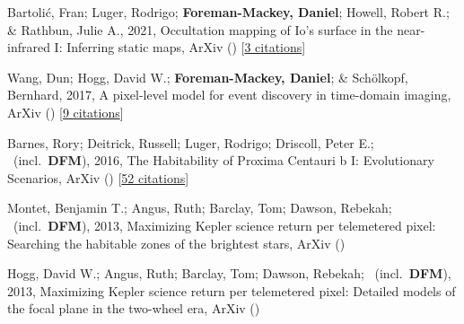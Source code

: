 \item[{\color{numcolor}\scriptsize5}] Bartoli{\'c}, Fran; Luger, Rodrigo; \textbf{Foreman-Mackey, Daniel}; Howell, Robert R.; \& Rathbun, Julie A., 2021, Occultation mapping of Io's surface in the near-infrared I: Inferring static maps, ArXiv () [\href{https://ui.adsabs.harvard.edu/abs/2021arXiv210303758B}{3 citations}]

\item[{\color{numcolor}\scriptsize4}] Wang, Dun; Hogg, David W.; \textbf{Foreman-Mackey, Daniel}; \& Sch{\"o}lkopf, Bernhard, 2017, A pixel-level model for event discovery in time-domain imaging, ArXiv () [\href{https://ui.adsabs.harvard.edu/abs/2017arXiv171002428W}{9 citations}]

\item[{\color{numcolor}\scriptsize3}] Barnes, Rory; Deitrick, Russell; Luger, Rodrigo; Driscoll, Peter E.; \etal\ (incl.\ \textbf{DFM}), 2016, The Habitability of Proxima Centauri b I: Evolutionary Scenarios, ArXiv () [\href{https://ui.adsabs.harvard.edu/abs/2016arXiv160806919B}{52 citations}]

\item[{\color{numcolor}\scriptsize2}] Montet, Benjamin T.; Angus, Ruth; Barclay, Tom; Dawson, Rebekah; \etal\ (incl.\ \textbf{DFM}), 2013, Maximizing Kepler science return per telemetered pixel: Searching the habitable zones of the brightest stars, ArXiv ()

\item[{\color{numcolor}\scriptsize1}] Hogg, David W.; Angus, Ruth; Barclay, Tom; Dawson, Rebekah; \etal\ (incl.\ \textbf{DFM}), 2013, Maximizing Kepler science return per telemetered pixel: Detailed models of the focal plane in the two-wheel era, ArXiv ()